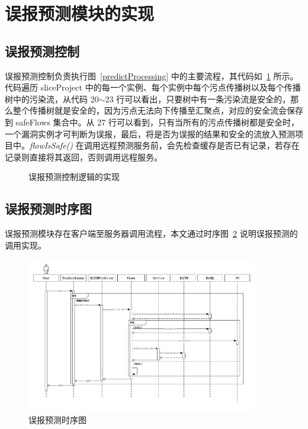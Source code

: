 \section{误报预测模块的实现}

\subsection{误报预测控制}
误报预测控制负责执行图~\ref{predictProcessing} 中的主要流程，其代码如~\ref{code:predictRunner} 所示。
代码遍历 sliceProject 中的每一个实例、每个实例中每个污点传播树以及每个传播树中的污染流，从代码 20$\sim$23 行可以看出，只要树中有一条污染流是安全的，那么整个传播树就是安全的，因为污点无法向下传播至汇聚点，对应的安全流会保存到 safeFlows 集合中。从 27 行可以看到，只有当所有的污点传播树都是安全时，一个漏洞实例才可判断为误报，最后，将是否为误报的结果和安全的流放入预测项目中。\textit{flowIsSafe()} 在调用远程预测服务前，会先检查缓存是否已有记录，若存在记录则直接将其返回，否则调用远程服务。

\begin{figure}[htbp]
    \centering
    \begin{minipage}{0.9\textwidth}
        
    \end{minipage}
    \caption{误报预测控制逻辑的实现}\label{code:predictRunner}
\end{figure}


\subsection{误报预测时序图}
误报预测模块存在客户端至服务器调用流程，本文通过时序图~\ref{predictTime} 说明误报预测的调用实现。

\begin{figure}[!htb]
    \centering
    \includegraphics[width=0.9\textwidth]{FIGs/chapter4/predictTime.pdf}
    \caption{误报预测时序图}\label{predictTime}
\end{figure}

